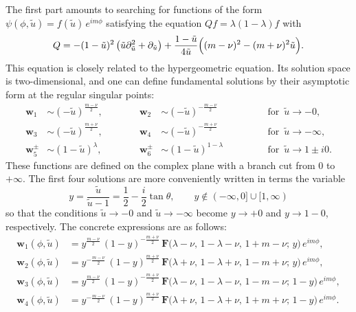 \documentclass[11pt]{article}
\newcommand{\hgfs}{\mathbf{F}}
\newcommand{\tu}{\tilde{u}}
\newcommand{\ww}{\mathbf{w}}
\begin{document}
The first part amounts to searching for functions of the form $\psi(\phi,\tu)=f(\tu)\,e^{im\phi}$ satisfying the equation $Qf=\lambda(1-\lambda)f$ with
\begin{equation} \label{tgQ}
Q=-(1-\tu)^2\,\bigl(\tu\partial_{\tu}^2+\partial_{\tu}\bigr)
+\frac{1-\tu}{4\tu}\Bigl((m-\nu)^2-(m+\nu)^{2}\tu\Bigr).
\end{equation}
This equation is closely related to the hypergeometric equation. Its solution space is two-dimensional, and one can define fundamental solutions by their asymptotic form at the regular singular points:
\begin{equation}
\begin{alignedat}{3}
\ww_1&\sim (-\tu)^{\frac{m-\nu}{2}},\qquad\quad&
\ww_2&\sim (-\tu)^{-\frac{m-\nu}{2}}\qquad\quad&
&\text{for }\, \tu\to-0, \\[3pt]
\ww_3&\sim (-\tu)^{\frac{m+\nu}{2}},\qquad\quad&
\ww_4&\sim (-\tu)^{-\frac{m+\nu}{2}}\qquad\quad&
&\text{for }\, \tu\to-\infty, \\[3pt]
\ww_5^{\pm}&\sim (1-\tu)^{\lambda},\qquad\quad&
\ww_6^{\pm}&\sim (1-\tu)^{1-\lambda}\qquad\quad&
&\text{for }\, \tu\to 1\pm i0.
\end{alignedat}
\end{equation}
These functions are defined on the complex plane with a branch cut from $0$ to $+\infty$. The first four solutions are more conveniently written in terms the variable
\begin{equation}
y=\frac{\tu}{\tu-1}=\frac{1}{2}-\frac{i}{2}\tan\theta,\qquad
y\notin(-\infty,0]\cup[1,\infty)
\end{equation}
so that the conditions $\tu\to-0$ and $\tu\to-\infty$ become $y\to+0$ and $y\to1-0$, respectively. The concrete expressions are as follows:
\begin{equation}\label{ww1234}
\begin{aligned}
\ww_1(\phi,\tu)&=y^{\frac{m-\nu}{2}}\,(1-y)^{-\frac{m+\nu}{2}}\,
\hgfs\bigl(\lambda-\nu,\,1-\lambda-\nu,\,1+m-\nu;\,y\bigl)\, e^{im\phi},\\[3pt]
\ww_2(\phi,\tu)&=y^{-\frac{m-\nu}{2}}\,(1-y)^{\frac{m+\nu}{2}}\,
\hgfs\bigl(\lambda+\nu,\,1-\lambda+\nu,\,1-m+\nu;\,y\bigl)\, e^{im\phi},\\[3pt]
\ww_3(\phi,\tu)&=y^{\frac{m-\nu}{2}}\,(1-y)^{-\frac{m+\nu}{2}}\,
\hgfs\bigl(\lambda-\nu,\,1-\lambda-\nu,\,1-m-\nu;\,1-y\bigl)\, e^{im\phi},\\[3pt]
\ww_4(\phi,\tu)&=y^{-\frac{m-\nu}{2}}\,(1-y)^{\frac{m+\nu}{2}}\,
\hgfs\bigl(\lambda+\nu,\,1-\lambda+\nu,\,1+m+\nu;\,1-y\bigl)\, e^{im\phi}.
\end{aligned}
\end{equation}
\end{document}
